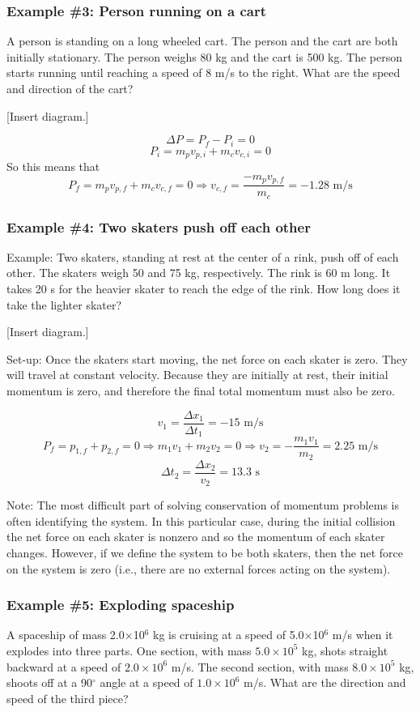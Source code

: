 \subsubsection{Example \#3: Person running on a cart}
A person is standing on a long wheeled cart.  The person and the cart are both initially stationary. The person weighs 80 kg and the cart is 500 kg. The person starts running until reaching a speed of 8 m/s to the right. What are the speed and direction of the cart?

[Insert diagram.]
\vspace{5cm}

$$\Delta{P}=P_f-P_i=0$$
$$P_i=m_pv_{p,i}+m_cv_{c,i}=0$$
So this means that
$$P_f=m_pv_{p,f}+m_cv_{c,f}=0\Rightarrow v_{c,f}=\frac{-m_pv_{p,f}}{m_c}=-1.28\mbox{ m/s}$$

\subsubsection{Example \#4: Two skaters push off each other}
Example: Two skaters, standing at rest at the center of a rink, push off of each other. The skaters weigh 50 and 75 kg, respectively. The rink is 60 m long. It takes 20 s for the heavier skater to reach the edge of the rink. How long does it take the lighter skater?

[Insert diagram.]
\vspace{5cm}

Set-up: Once the skaters start moving, the net force on each skater is zero. They will travel at constant velocity. Because they are initially at rest, their initial momentum is zero, and therefore the final total momentum must also be zero.

$$v_1=\frac{\Delta{x_1}}{\Delta{t_1}}=-15\mbox{ m/s}$$
$$P_f=p_{1,f}+p_{2,f}=0\Rightarrow m_1v_1+m_2v_2=0\Rightarrow v_2=-\frac{m_1v_1}{m_2}=2.25\mbox{ m/s}$$
$$\Delta{t_2}=\frac{\Delta{x_2}}{v_2}=13.3\mbox{ s}$$

Note: The most difficult part of solving conservation of momentum problems is often identifying the system. In this particular case, during the initial collision the net force on each skater is nonzero and so the momentum of each skater changes. However, if we define the system to be both skaters, then the net force on the system is zero (i.e., there are no external forces acting on the system).

\subsubsection{Example \#5: Exploding spaceship}
A spaceship of mass 2.0$\times$10$^6$ kg is cruising at a speed of 5.0$\times$10$^6$ m/s when it explodes into three parts. One section, with mass $5.0\times 10^5$ kg, shots straight backward at a speed of $2.0\times 10^6$ m/s. The second section, with mass $8.0\times 10^5$ kg, shoots off at a 90$^\circ$ angle at a speed of $1.0\times 10^6$ m/s. What are the direction and speed of the third piece?

